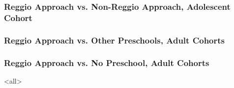 \documentclass[dynamic]{JJH-Beamer}
\begin{document}
\begin{frame}
\centering
\frametitle{Reggio Approach vs. Non-Reggio Approach, Adolescent Cohort}
\end{frame}

\begin{frame}
\centering
\frametitle{Reggio Approach vs. Other Preschools, Adult Cohorts}
\end{frame}

\begin{frame}
\centering
\frametitle{Reggio Approach vs. No Preschool, Adult Cohorts}
\end{frame}



\mode<all>

\savebox\hiddenbib{\parbox{\textwidth}{}}
\end{document}
